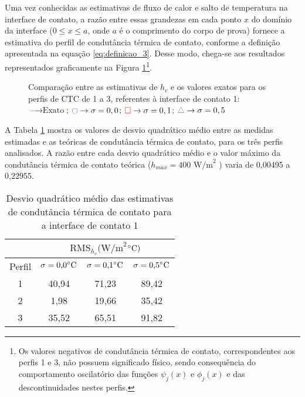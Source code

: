 Uma vez conhecidas as estimativas de fluxo de calor e salto de temperatura na interface de contato, a razão entre essas grandezas em cada ponto $x$ do domínio da interface ($0 \le x \le a$, onde $a$ é o comprimento do corpo de prova) fornece a estimativa do perfil de condutância térmica de contato, conforme a definição apresentada na equação \eqref{eq:definicao_3}. Desse modo, chega-se aos resultados representados graficamente na Figura \ref{figura_ctc_interface_01}\footnote{Os valores negativos de condutância térmica de contato, correspondentes aos perfis 1 e 3, não possuem significado físico, sendo consequência do comportamento oscilatório das funções $\psi_j(x)$ e $\phi_j(x)$ e das descontinuidades nestes perfis.}.
\begin{figure}[H]
	\caption{Comparação entre as estimativas de $h_c$ e os valores exatos para os perfis de CTC de 1 a 3, referentes à interface de contato 1: $\text{--} \rightarrow \text{Exato}$; $\textcolor{blue}{\ocircle} \rightarrow \sigma = 0,0$; $\textcolor{red}{\square} \rightarrow \sigma = 0,1$; $\textcolor{gray}{\triangle} \rightarrow \sigma = 0,5$}
	\label{figura_ctc_interface_01}
\end{figure}

A Tabela \ref{tabela_rms_ctc_interface_1} mostra os valores de desvio quadrático médio entre as medidas estimadas e as teóricas de condutância térmica de contato, para os três perfis analisados. A razão entre cada desvio quadrático médio e o valor máximo da condutância térmica de contato teórica ($h_{max} = 400 \text{ W/m}^2$ \celsius) varia de 0,00495 a 0,22955.
\begin{table}[H]
	\centering
	\caption{Desvio quadrático médio das estimativas de condutância térmica de contato para a interface de contato 1}
	\begin{tabular}{c|c|c|c|}
		\cline{2-4}
		& \multicolumn{3}{c|}{$\text{RMS}_{h_c}(\text{W/m}^{2}$$\celsius)$} \\ \hline
		\multicolumn{1}{|c|}{Perfil} & $\sigma = \text{0,0}\celsius$   & $\sigma = \text{0,1}\celsius$    & $\sigma = \text{0,5}\celsius$  \\ \hline
		\multicolumn{1}{|c|}{1}      & 40,94       & 71,23           & 89,42       \\ \hline
		\multicolumn{1}{|c|}{2}      & 1,98       &  19,66      &   35,42    \\ \hline
		\multicolumn{1}{|c|}{3}      & 35,52            &  65,51      & 91,82      \\ \hline
	\end{tabular}
	\label{tabela_rms_ctc_interface_1}
\end{table}

